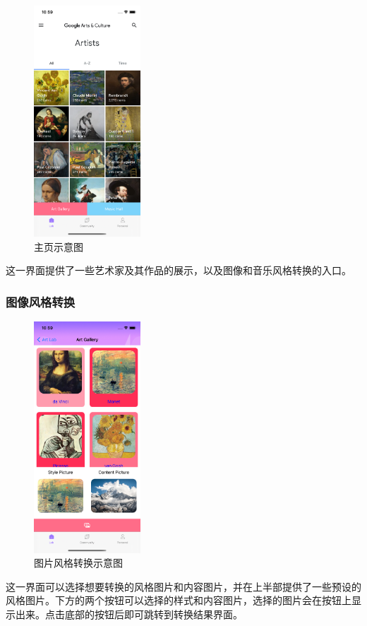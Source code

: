\begin{figure}
\includegraphics[width=4cm]{figures/主页.png}
\caption{主页示意图}
\label{fig:my_label}
\end{figure}

这一界面提供了一些艺术家及其作品的展示，以及图像和音乐风格转换的入口。

\subsubsection{图像风格转换}

\begin{figure}
\includegraphics[width=4cm]{figures/图片风格转换.png}
\caption{图片风格转换示意图}
\label{fig:my_label}
\end{figure}


这一界面可以选择想要转换的风格图片和内容图片，并在上半部提供了一些预设的风格图片。下方的两个按钮可以选择的样式和内容图片，选择的图片会在按钮上显示出来。点击底部的按钮后即可跳转到转换结果界面。

